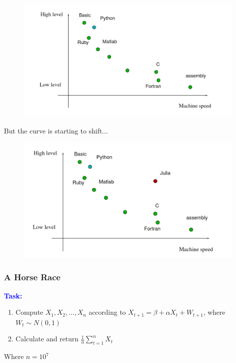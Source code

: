 \documentclass[
  xcolor={svgnames},
  hyperref={colorlinks,citecolor=DeepPink4,linkcolor=DarkRed,urlcolor=DarkBlue}
  ]{beamer}  %
\newcommand\boldblue[1]{\textcolor{blue}{\textbf{#1}}}
\begin{document}
\begin{frame}

  \begin{figure}
    \includegraphics[width=\textwidth]{languages.jpeg}
  \end{figure}

  But the curve is starting to shift...
\end{frame}

\begin{frame}

  \begin{figure}
    \includegraphics[width=\textwidth]{languages_shifted.jpeg}
  \end{figure}
\end{frame}

\begin{frame}
  \frametitle{A Horse Race}

  \boldblue{Task:}
  \vspace{1em}
  \begin{enumerate}
    \item Compute $X_1, X_2, \dots, X_n$ according to $X_{t+1} = \beta + \alpha X_{t} + W_{t+1}$, where $W_t \sim N(0,1)$
    \item Calculate and return $ \frac{1}{n} \sum_{t=1}^n X_t $
  \end{enumerate}

  \vspace{1em}
  Where $n = 10^7$

\end{frame}
\end{document}
